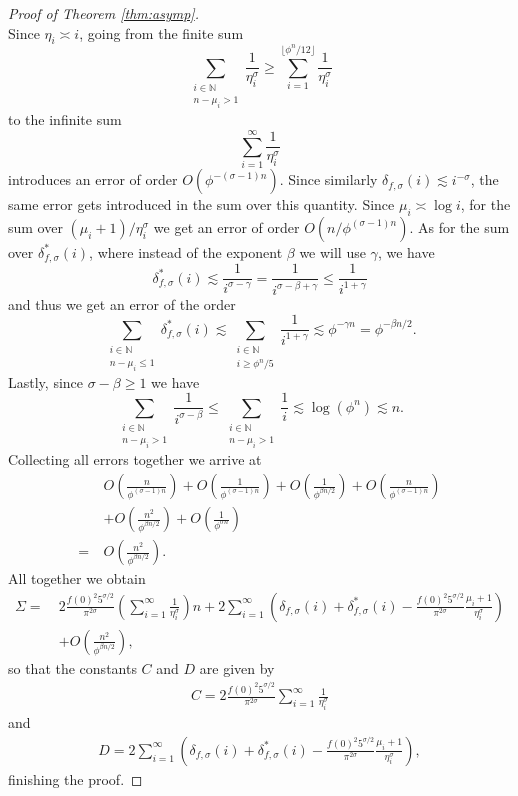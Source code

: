 \documentclass[10pt,a4paper]{amsart}
\newcommand{\bbN}{\mathbb{N}}
\begin{document}
\begin{proof}[Proof of Theorem \ref{thm:asymp}]
$$    $$
    Since $\eta_i \asymp i$, going from the finite sum
    $$
    \sum_{\substack{i \in \bbN \\ n-\mu_i > 1}} \frac1{\eta_i^\sigma} \geq \sum_{i = 1}^{\lfloor\phi^n/12 \rfloor} \frac1{\eta_i^\sigma}
    $$
    to the infinite sum
    $$
    \sum_{i = 1}^\infty \frac1{\eta_i^\sigma}
    $$
    introduces an error of order $O\left(\phi^{-(\sigma-1)n}\right)$. Since similarly $\delta_{f, \sigma}(i) \lesssim i^{-\sigma}$, the same error gets introduced in the sum over this quantity. Since $\mu_i \asymp \log i$, for the sum over $(\mu_i+1)/\eta_i^\sigma$ we get an error of order $O\left(n/\phi^{(\sigma-1)n}\right)$. As for the sum over $\delta^*_{f, \sigma}(i)$, where instead of the exponent $\beta$ we will use $\gamma$, we have
    $$
    \delta^*_{f, \sigma}(i) \lesssim \frac1{i^{\sigma-\gamma}} = \frac1{i^{\sigma - \beta + \gamma}} \leq \frac1{i^{1+\gamma}}
    $$
    and thus we get an error of the order
    $$
    \sum_{\substack{i \in \bbN \\ n-\mu_i \leq 1}} \delta^*_{f, \sigma}(i) \lesssim \sum_{\substack{i \in \bbN \\ i \geq \phi^n/5}} \frac1{i^{1+\gamma}} \lesssim \phi^{-\gamma n} = \phi^{-\beta n/2}.
    $$
    Lastly, since $\sigma-\beta \geq 1$ we have
    $$
    \sum_{\substack{i \in \bbN \\ n-\mu_i > 1}} \frac1{i^{\sigma-\beta}} \leq \sum_{\substack{i \in \bbN \\ n-\mu_i > 1}} \frac1{i} \lesssim \log(\phi^n) \lesssim n.
    $$
    Collecting all errors together we arrive at
    \begin{align*}
        & O\left(\frac{n}{\phi^{(\sigma-1)n}}\right) + O\left(\frac{1}{\phi^{(\sigma-1)n}}\right) + O\left(\frac{1}{\phi^{\beta n/2}}\right) + O\left(\frac{n}{\phi^{(\sigma-1)n}}\right) \\
        & + O\left(\frac{n^2}{\phi^{\beta n/2}}\right) + O\left(\frac{1}{\phi^{\sigma n}}\right) \\
        = ~ & O\left(\frac{n^2}{\phi^{\beta n/2}}\right).
    \end{align*}
    All together we obtain
    \begin{align*}
        \Sigma = ~ & 2\frac{f(0)^2 5^{\sigma/2}}{\pi^{2\sigma}} \left(\sum_{i=1}^\infty \frac1{\eta_i^\sigma}\right) n + 2\sum_{i=1}^\infty \left(\delta_{f, \sigma}(i) + \delta_{f, \sigma}^*(i) - \frac{f(0)^2 5^{\sigma/2}}{\pi^{2\sigma}} \frac{\mu_i+1}{\eta_i^\sigma}\right) \\
        & + O\left(\frac{n^2}{\phi^{\beta n/2}}\right),
    \end{align*}
    so that the constants $C$ and $D$ are given by
    \begin{align} \label{C}
        C = 2\frac{f(0)^2 5^{\sigma/2}}{\pi^{2\sigma}} \sum_{i=1}^\infty \frac1{\eta_i^\sigma}
    \end{align}
    and
    \begin{align} \label{D}
        D = 2\sum_{i=1}^\infty \left(\delta_{f, \sigma}(i) + \delta_{f, \sigma}^*(i) - \frac{f(0)^2 5^{\sigma/2}}{\pi^{2\sigma}} \frac{\mu_i+1}{\eta_i^\sigma}\right),
    \end{align}
    finishing the proof.
\end{proof}
\end{document}
